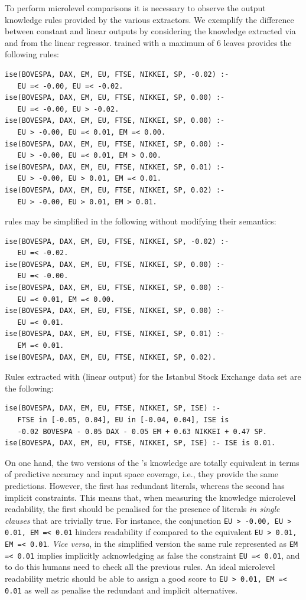 \documentclass[sigconf]{acmart}
\begin{document}
To perform microlevel comparisons it is necessary to observe the output knowledge rules provided by the various extractors.
%
We exemplify the difference between constant and linear outputs by considering the knowledge extracted via \cart{} and \creepy{} from the linear regressor.
%
\cart{} trained with a maximum of 6 leaves provides the following rules:
%
\begin{lstlisting}
ise(BOVESPA, DAX, EM, EU, FTSE, NIKKEI, SP, -0.02) :-
   EU =< -0.00, EU =< -0.02.
ise(BOVESPA, DAX, EM, EU, FTSE, NIKKEI, SP, 0.00) :-
   EU =< -0.00, EU > -0.02.
ise(BOVESPA, DAX, EM, EU, FTSE, NIKKEI, SP, 0.00) :-
   EU > -0.00, EU =< 0.01, EM =< 0.00.
ise(BOVESPA, DAX, EM, EU, FTSE, NIKKEI, SP, 0.00) :-
   EU > -0.00, EU =< 0.01, EM > 0.00.
ise(BOVESPA, DAX, EM, EU, FTSE, NIKKEI, SP, 0.01) :-
   EU > -0.00, EU > 0.01, EM =< 0.01.
ise(BOVESPA, DAX, EM, EU, FTSE, NIKKEI, SP, 0.02) :-
   EU > -0.00, EU > 0.01, EM > 0.01.
\end{lstlisting}
%
\cart{} rules may be simplified in the following without modifying their semantics:
%
\begin{lstlisting}
ise(BOVESPA, DAX, EM, EU, FTSE, NIKKEI, SP, -0.02) :-
   EU =< -0.02.
ise(BOVESPA, DAX, EM, EU, FTSE, NIKKEI, SP, 0.00) :-
   EU =< -0.00.
ise(BOVESPA, DAX, EM, EU, FTSE, NIKKEI, SP, 0.00) :-
   EU =< 0.01, EM =< 0.00.
ise(BOVESPA, DAX, EM, EU, FTSE, NIKKEI, SP, 0.00) :-
   EU =< 0.01.
ise(BOVESPA, DAX, EM, EU, FTSE, NIKKEI, SP, 0.01) :-
   EM =< 0.01.
ise(BOVESPA, DAX, EM, EU, FTSE, NIKKEI, SP, 0.02).
\end{lstlisting}
%
Rules extracted with \creepy{} (linear output) for the Istanbul Stock Exchange data set are the following:
%
\begin{lstlisting}
ise(BOVESPA, DAX, EM, EU, FTSE, NIKKEI, SP, ISE) :-
   FTSE in [-0.05, 0.04], EU in [-0.04, 0.04], ISE is 
   -0.02 BOVESPA - 0.05 DAX - 0.05 EM + 0.63 NIKKEI + 0.47 SP.
ise(BOVESPA, DAX, EM, EU, FTSE, NIKKEI, SP, ISE) :- ISE is 0.01.
\end{lstlisting}

On one hand, the two versions of the \cart{}'s knowledge are totally equivalent in terms of predictive accuracy and input space coverage, i.e., they provide the same predictions.
%
However, the first has redundant literals, whereas the second has implicit constraints.
%
This means that, when measuring the knowledge microlevel readability, the first should be penalised for the presence of literals \emph{in single clauses} that are trivially true.
%
For instance, the conjunction \verb|EU > -0.00, EU > 0.01, EM =< 0.01| hinders readability if compared to the equivalent \verb|EU > 0.01, EM =< 0.01|.
%
\emph{Vice versa}, in the simplified version the same rule represented as \verb|EM =< 0.01| implies implicitly acknowledging as false the constraint \verb|EU =< 0.01|, and to do this humans need to check all the previous rules.
%
An ideal microlevel readability metric should be able to assign a good score to \verb|EU > 0.01, EM =< 0.01| as well as penalise the redundant and implicit alternatives.
\end{document}
